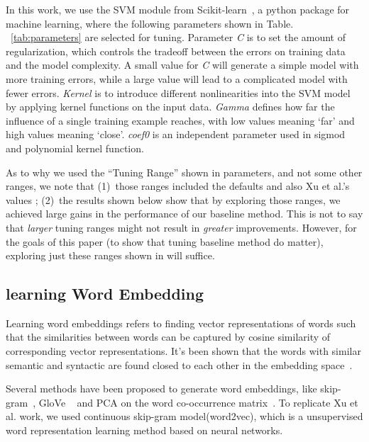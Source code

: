 In this work, we use the SVM module from Scikit-learn~\cite{scikit-learn}, a python package for machine learning,
where the following parameters shown in Table. ~\ref{tab:parameters} are selected for tuning.
Parameter {\it C} is to set the amount of regularization, which controls the tradeoff between
the errors on training data and the model complexity.  A small value for {\it C} will generate 
a simple model with more training errors, while a large value will lead to a complicated model with fewer
errors. {\it Kernel} is to introduce different nonlinearities into the SVM model by applying kernel functions
on the input data. {\it Gamma } defines how far the influence of a single training example reaches, 
with low values meaning `far' and high values meaning `close'. {\it coef0} is an independent parameter used
in sigmod and  polynomial kernel function.

As to why we used the ``Tuning Range'' shown in {parameters}, and not some other ranges,
we note that (1)~those ranges included the defaults and also Xu et al.'s values ; (2)~the results shown below
show that by exploring those ranges,  we achieved large gains in the performance of our baseline method.
This is not to say that {\em larger} tuning ranges might not result in {\em greater} improvements.
However, for the goals of this paper (to show that tuning baseline method do matter), exploring
just these ranges shown in  will suffice.




\subsection{learning Word Embedding}
Learning word embeddings refers to finding vector representations
of words such that the similarities between words can be captured by cosine similarity of corresponding 
vector representations. It's been shown that the words with similar semantic and syntactic are found closed
to each other in the embedding space~\cite{mikolov2013distributed}.

Several methods have been proposed to generate word embeddings, 
like skip-gram~\cite{mikolov2013distributed}, GloVe ~\cite{pennington2014glove}
and PCA on the word co-occurrence matrix~\cite{lebret2013word}. To replicate Xu et al. work,
we used continuous skip-gram model(word2vec),  which is a unsupervised word representation learning method based on
neural networks. 

